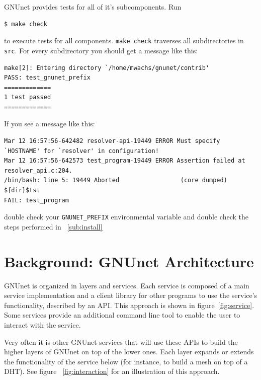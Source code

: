\documentclass[10pt]{article}
\begin{document}
GNUnet provides tests for all of it's subcomponents. Run
\begin{lstlisting}
$ make check
\end{lstlisting}
to execute tests for all components. {\tt make check} traverses all subdirectories in {\tt src}.
For every subdirectory you should get a message like this:

\begin{lstlisting}
make[2]: Entering directory `/home/mwachs/gnunet/contrib'
PASS: test_gnunet_prefix
=============
1 test passed
=============
\end{lstlisting}

If you see a message like this:

\begin{lstlisting}
Mar 12 16:57:56-642482 resolver-api-19449 ERROR Must specify `HOSTNAME' for `resolver' in configuration!
Mar 12 16:57:56-642573 test_program-19449 ERROR Assertion failed at resolver_api.c:204.
/bin/bash: line 5: 19449 Aborted                 (core dumped) ${dir}$tst
FAIL: test_program
\end{lstlisting}
double check your {\tt GNUNET\_PREFIX} environmental variable and double check the steps performed in ~\ref{sub:install}

\section{Background: GNUnet Architecture}
GNUnet is organized in layers and services. Each service is composed of a
main service implementation and a client library for other programs to use
the service's functionality, described by an API. This approach is shown in
figure~\ref{fig:service}. Some services provide an additional command line
tool to enable the user to interact with the service.

Very often it is other GNUnet services that will use these APIs to build the
higher layers of GNUnet on top of the lower ones. Each layer expands or extends
the functionality of the service below (for instance, to build a mesh on top of
a DHT). See figure ~\ref{fig:interaction} for an illustration of this approach.
\end{document}
